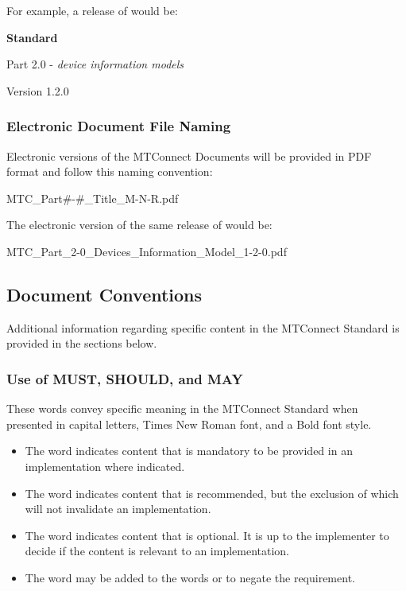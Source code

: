 \documentclass{mtconnect}	%
\begin{document}
For example, a release of  would be:

\newline \centerline{\large{\textbf{\mtconnectregistered Standard}}}
\newline \centerline{Part 2.0 - \textit{\glspl{device information model}}}
\newline \centerline{Version 1.2.0}

\subsubsection{Electronic Document File Naming}

Electronic versions of the MTConnect Documents will be provided in PDF format and follow this naming convention:

\tab MTC\_Part\#-\#\_Title\_M-N-R.pdf 

The electronic version of the same release of  would be:

\tab MTC\_Part\_2-0\_Devices\_Information\_Model\_1-2-0.pdf

\subsection{Document Conventions}

Additional information regarding specific content in the MTConnect Standard is provided in the sections below.

\subsubsection{Use of MUST, SHOULD, and MAY}

These words convey specific meaning in the MTConnect Standard when presented in capital letters, Times New Roman font, and a Bold font style. 

\begin{itemize}
\item	The word \MUST indicates content that is mandatory to be provided in an implementation where indicated.

\item	The word \SHOULD indicates content that is recommended, but the exclusion of which will not invalidate an implementation.

\item	The word \MAY indicates content that is optional.  It is up to the implementer to decide if the content is relevant to an implementation.

\item 	The word \NOT may be added to the words \MUST or \SHOULD to negate the requirement.
\end{itemize}
\end{document}
